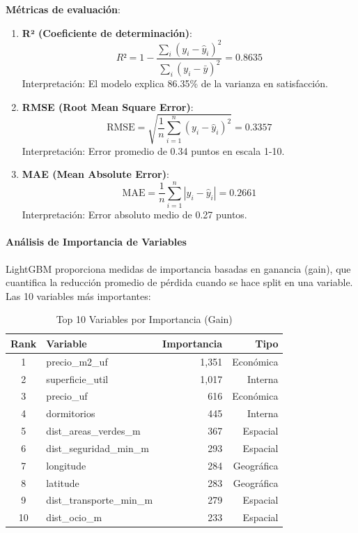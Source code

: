 \textbf{Métricas de evaluación}:

\begin{enumerate}
    \item \textbf{R² (Coeficiente de determinación)}:
    \begin{equation}
    R² = 1 - \frac{\sum_{i}(y_i - \hat{y}_i)^2}{\sum_{i}(y_i - \bar{y})^2} = 0.8635
    \end{equation}
    Interpretación: El modelo explica 86.35\% de la varianza en satisfacción.
    
    \item \textbf{RMSE (Root Mean Square Error)}:
    \begin{equation}
    \text{RMSE} = \sqrt{\frac{1}{n}\sum_{i=1}^{n}(y_i - \hat{y}_i)^2} = 0.3357
    \end{equation}
    Interpretación: Error promedio de 0.34 puntos en escala 1-10.
    
    \item \textbf{MAE (Mean Absolute Error)}:
    \begin{equation}
    \text{MAE} = \frac{1}{n}\sum_{i=1}^{n}|y_i - \hat{y}_i| = 0.2661
    \end{equation}
    Interpretación: Error absoluto medio de 0.27 puntos.
\end{enumerate}

\paragraph{Análisis de Importancia de Variables}

LightGBM proporciona medidas de importancia basadas en ganancia (gain), que cuantifica la reducción promedio de pérdida cuando se hace split en una variable. Las 10 variables más importantes:

\begin{table}[H]
\centering
\caption{Top 10 Variables por Importancia (Gain)}
\begin{tabular}{@{}clrr@{}}
\toprule
\textbf{Rank} & \textbf{Variable} & \textbf{Importancia} & \textbf{Tipo} \\
\midrule
1 & precio\_m2\_uf & 1,351 & Económica \\
2 & superficie\_util & 1,017 & Interna \\
3 & precio\_uf & 616 & Económica \\
4 & dormitorios & 445 & Interna \\
5 & dist\_areas\_verdes\_m & 367 & Espacial \\
6 & dist\_seguridad\_min\_m & 293 & Espacial \\
7 & longitude & 284 & Geográfica \\
8 & latitude & 283 & Geográfica \\
9 & dist\_transporte\_min\_m & 279 & Espacial \\
10 & dist\_ocio\_m & 233 & Espacial \\
\bottomrule
\end{tabular}
\end{table}

